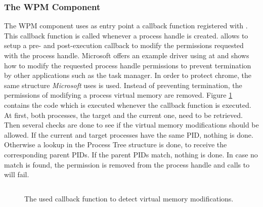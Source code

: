 \subsubsection{The WPM Component}
The \gls{WPM} component uses as entry point a callback function registered with . This callback function is called whenever a process handle is created.  allows to setup a pre- and post-execution callback to modify the permissions requested with the process handle. Microsoft offers an example driver using  at \cite{github_obcallback} and shows how to modify the requested process handle permissions to prevent termination by other applications such as the task manager. In order to protect chrome, the same structure \emph{Microsoft} uses is used. Instead of preventing termination, the permissions of modifying a process virtual memory are removed. Figure \ref{code:code7} contains the code which is executed whenever the callback function is executed. At first, both processes, the target and the current one, need to be retrieved. Then several checks are done to see if the virtual memory modifications should be allowed. If the current and target processes have the same \gls{PID}, nothing is done. Otherwise a lookup in the Process Tree structure is done, to receive the corresponding parent \glspl{PID}. If the parent \glspl{PID} match, nothing is done. In case no match is found, the permission  is removed from the process handle and calls to  will fail.
\begin{figure}[tbph]
\inputminted[breakanywhere, breaklines,fontsize=\scriptsize, frame=single, mathescape, linenos, numbersep=5pt, numbersep=5pt, xleftmargin=0pt]{c}{sections/implementation/code7.c}
\caption{The used callback function to detect virtual memory modifications.}
\label{code:code7}
\end{figure}
